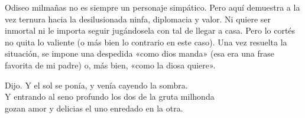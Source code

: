 Odiseo milmañas no es siempre un personaje simpático. Pero aquí demuestra a la vez ternura hacia la desilusionada ninfa, diplomacia y valor. Ni quiere ser inmortal ni le importa seguir jugándosela con tal de llegar a casa. Pero lo cortés no quita lo valiente (o más bien lo contrario en este caso). Una vez resuelta la situación, se impone una despedida «como dios manda» (esa era una frase favorita de mi padre) o, más bien, «como la diosa quiere».

\begin{versocita}
Dijo. Y el sol se ponía, y venía cayendo la sombra.\\
Y entrando al seno profundo los dos de la gruta milhonda\\
gozan amor y delicias el uno enredado en la otra.
\end{versocita}
